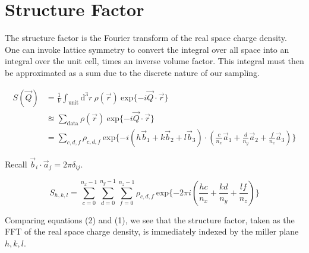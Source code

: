 \documentclass[notitlepage,letter,preprint,prb]{revtex4}
\begin{document}
\section{Structure Factor}
	The structure factor is the Fourier transform of the real space charge density.  One can invoke lattice symmetry to convert the integral over all space into an integral over the unit cell, times an inverse volume factor. This integral must then be approximated as a sum due to the discrete nature of our sampling.    
	
	\begin{align}
	S(\vec{Q}) &= \frac{1}{V}\int_{\mathrm{unit}} \mathrm{d}^{3}r\ \rho(\vec{r})\  \mathrm{exp}\{{-i\vec{Q}\cdot{\vec{r}}\}} \nonumber \\
	&\approxeq
	\sum_{\mathrm{data}}\rho(\vec{r})\ \mathrm{exp}\{-i\vec{Q}\cdot\vec{r}\} \nonumber\\
	&= \sum_{c,d,f}\rho_{c,d,f}\ \mathrm{exp}\{-i(h\vec{b}_1 + k\vec{b}_2 + l\vec{b}_3)\cdot(\frac{c}{n_x}\vec{a}_1+\frac{d}{n_y}\vec{a}_2+\frac{f}{n_z}\vec{a}_3)\} \nonumber
	\end{align}
	
	Recall $\vec{b}_i \cdot \vec{a}_j = 2\pi\delta_{ij}$.
	
	\begin{equation}
	S_{h,k,l} = {\sum_{c=0}^{n_x-1}}{\sum_{d=0}^{n_y-1}}{\sum_{f=0}^{n_z-1}}\rho_{c,d,f}\ \mathrm{exp}\{-2\pi i(\frac{hc}{n_x}+\frac{kd}{n_y}+\frac{lf}{n_z})\}
	\end{equation}
	
	Comparing equations (2) and (1), we see that the structure factor, taken as the FFT of the real space charge density, is immediately indexed by the miller plane ${h,k,l}$.  
	
\end{document}

